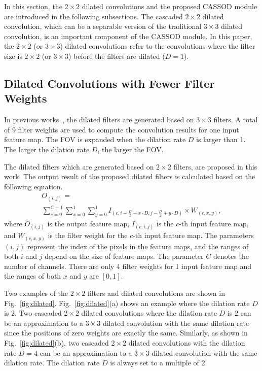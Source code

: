 \documentclass[10pt,twocolumn,letterpaper]{article}
\begin{document}
In this section, the $2 \times 2$ dilated convolutions and the proposed CASSOD module are introduced in the following subsections. The cascaded $2 \times 2$ dilated convolution, which can be a separable version of the traditional $3 \times 3$ dilated convolution, is an important component of the CASSOD module. In this paper, the $2 \times 2$ (or $3 \times 3$) dilated convolutions refer to the convolutions where the filter size is $2 \times 2$ (or $3 \times 3$) before the filters are dilated ($D = 1$).


\subsection{Dilated Convolutions with Fewer Filter Weights}
\label{subsec:dilated}

In previous works~\cite{Hamaguchi17, Hussain19, Lei19, Li18_0, Lin18, Mehta18, Tian18, Wu19, Zhou18}, the dilated filters are generated based on $3 \times 3$ filters. A total of 9 filter weights are used to compute the convolution results for one input feature map. The FOV is expanded when the dilation rate $D$ is larger than 1. The larger the dilation rate $D$, the larger the FOV.

The dilated filters which are generated based on $2 \times 2$ filters, are proposed in this work. The output result of the proposed dilated filters is calculated based on the following equation.
\begin{eqnarray}
  O_{(i,j)} = \nonumber \\
  \sum^{C-1}_{c=0} \sum^{1}_{x=0} \sum^{1}_{y=0} I_{\left(c,i - \frac{D}{2}+ x \cdot D, j- \frac{D}{2} + y \cdot D\right)}  \times W_{(c,x,y)},
\end{eqnarray}
where $O_{(i,j)}$ is the output feature map, $I_{(c,i,j)}$ is the $c$-th input feature map, and $W_{(c,x,y)}$ is the filter weight for the $c$-th input feature map. The parameters $(i,j)$ represent the index of the pixels in the feature maps, and the ranges of both $i$ and $j$ depend on the size of feature maps. The parameter $C$ denotes the number of channels. There are only 4 filter weights for 1 input feature map and the ranges of both $x$ and $y$ are $[0,1]$. 

Two examples of the $2 \times 2$ filters and dilated convolutions are shown in Fig.~\ref{fig:dilated}. Fig.~\ref{fig:dilated}(a) shows an example where the dilation rate $D$ is $2$. Two cascaded $2 \times 2$ dilated convolutions where the dilation rate $D$ is $2$ can be an approximation to a $3 \times 3$ dilated convolution with the same dilation rate since the positions of zero weights are exactly the same. Similarly, as shown in Fig.~\ref{fig:dilated}(b),  two cascaded $2 \times 2$ dilated convolutions with the dilation rate $D=4$ can be an approximation to a $3 \times 3$ dilated convolution with the same dilation rate. The dilation rate $D$ is always set to a multiple of 2.
\end{document}
